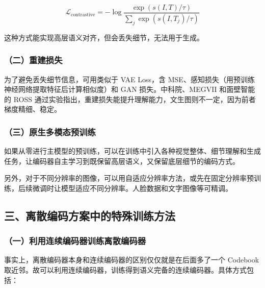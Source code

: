 \[
\mathcal{L}_{\mathrm{contrastive}}
=-\log\frac{\exp(s(I,T)/\tau)}
{\sum_j\exp(s(I,T_j)/\tau)}
\]

这种方式能实现高层语义对齐，但会丢失细节，无法用于生成。

\hypertarget{ux4e8cux91cdux5efaux635fux5931}{%
\subsubsection{（二）重建损失}\label{ux4e8cux91cdux5efaux635fux5931}}

为了避免丢失细节信息，可用类似于 VAE Loss，含 MSE、感知损失（用预训练神经网络提取特征后计算相似度）和 GAN 损失。中科院、MEGVII 和面壁智能的 ROSS 通过实验指出，重建损失能提升理解能力，文生图则不一定，因为前者梯度精细、稳定。

\hypertarget{ux4e09ux539fux751fux591aux6a21ux6001ux9884ux8badux7ec3}{%
\subsubsection{（三）原生多模态预训练}\label{ux4e09ux539fux751fux591aux6a21ux6001ux9884ux8badux7ec3}}

如果从零进行主模型的预训练，可以在训练中引入各种视觉整体、细节理解和生成任务，让编码器自主学习到既保留高层语义，又保留底层细节的编码方式。

另外，对于不同分辨率的图像，可以用自适应分辨率方法，或先在固定分辨率预训练，后续微调时让模型适应不同分辨率。人脸数据和文字图像等可精调。

\hypertarget{ux4e09ux79bbux6563ux7f16ux7801ux65b9ux6848ux4e2dux7684ux7279ux6b8aux8badux7ec3ux65b9ux6cd5}{%
\subsection{三、离散编码方案中的特殊训练方法}\label{ux4e09ux79bbux6563ux7f16ux7801ux65b9ux6848ux4e2dux7684ux7279ux6b8aux8badux7ec3ux65b9ux6cd5}}

\hypertarget{ux4e00ux5229ux7528ux8fdeux7eedux7f16ux7801ux5668ux8badux7ec3ux79bbux6563ux7f16ux7801ux5668}{%
\subsubsection{（一）利用连续编码器训练离散编码器}\label{ux4e00ux5229ux7528ux8fdeux7eedux7f16ux7801ux5668ux8badux7ec3ux79bbux6563ux7f16ux7801ux5668}}

事实上，离散编码器本身和连续编码器的区别仅仅就是在后面多了一个 Codebook 取近邻。故可以利用连续编码器，训练得到语义完备的连续编码器。具体方式包括：

